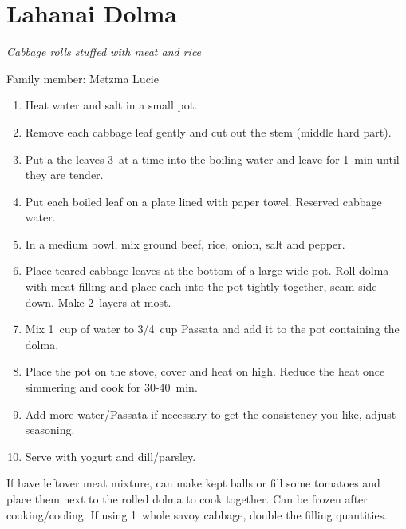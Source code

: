 \chapter{Lahanai Dolma}
\label{ch:lahanai_dolma}



\textit{Cabbage rolls stuffed with meat and rice}

Family member: Metzma Lucie

\begin{enumerate}
    \item Heat water and salt in a small pot.
    \item Remove each cabbage leaf gently and cut out the stem (middle hard part).
    \item Put a the leaves 3~at a time into the boiling water and leave for 1~min until they are tender.
    \item Put each boiled leaf on a plate lined with paper towel. Reserved cabbage water.
    \item In a medium bowl, mix ground beef, rice, onion, salt and pepper.
    \item Place teared cabbage leaves at the bottom of a large wide pot. Roll dolma with meat filling and place each into the pot tightly together, seam-side down. Make 2~layers at most.
    \item Mix 1~cup of water to 3/4~cup Passata and add it to the pot containing the dolma.
    \item Place the pot on the stove, cover and heat on high. Reduce the heat once simmering and cook for 30-40~min.
    \item Add more water/Passata if necessary to get the consistency you like, adjust seasoning.
    \item Serve with yogurt and dill/parsley.
\end{enumerate}

If have leftover meat mixture, can make kept balls or fill some tomatoes and place them next to the rolled dolma to cook together.
Can be frozen after cooking/cooling.
If using 1~whole savoy cabbage, double the filling quantities.
